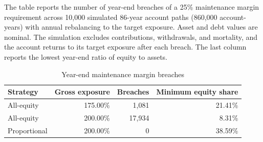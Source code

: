 \begin{table}[p]\centering
\caption{Year-end maintenance margin breaches}\label{tab:restored-margin}
\begin{minipage}{\linewidth}\small The table reports the number of year-end breaches of a 25\% maintenance margin requirement across 10,000 simulated 86-year account paths (860,000 account-years) with annual rebalancing to the target exposure. Asset and debt values are nominal. The simulation excludes contributions, withdrawals, and mortality, and the account returns to its target exposure after each breach. The last column reports the lowest year-end ratio of equity to assets.\end{minipage}
\medskip

{\small\setlength{\tabcolsep}{4pt}\begin{tabular}{lrrr}\toprule
Strategy & Gross exposure & Breaches & Minimum equity share \\ \midrule
All-equity & 175.00\% & 1,081 & 21.41\% \\
All-equity & 200.00\% & 17,934 & 8.31\% \\
Proportional & 200.00\% & 0 & 38.59\% \\
\bottomrule\end{tabular}}
\end{table}
